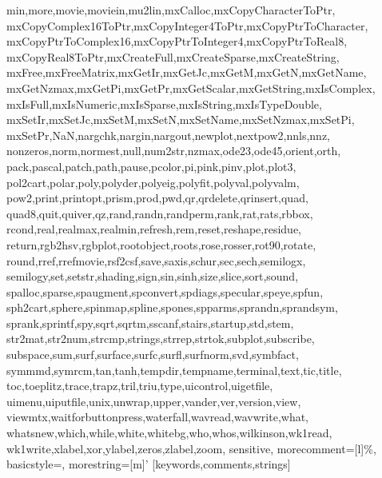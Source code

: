 {{      min,more,movie,moviein,mu2lin,mxCalloc,mxCopyCharacterToPtr,%
      mxCopyComplex16ToPtr,mxCopyInteger4ToPtr,mxCopyPtrToCharacter,%
      mxCopyPtrToComplex16,mxCopyPtrToInteger4,mxCopyPtrToReal8,%
      mxCopyReal8ToPtr,mxCreateFull,mxCreateSparse,mxCreateString,%
      mxFree,mxFreeMatrix,mxGetIr,mxGetJc,mxGetM,mxGetN,mxGetName,%
      mxGetNzmax,mxGetPi,mxGetPr,mxGetScalar,mxGetString,mxIsComplex,%
      mxIsFull,mxIsNumeric,mxIsSparse,mxIsString,mxIsTypeDouble,%
      mxSetIr,mxSetJc,mxSetM,mxSetN,mxSetName,mxSetNzmax,mxSetPi,%
      mxSetPr,NaN,nargchk,nargin,nargout,newplot,nextpow2,nnls,nnz,%
      nonzeros,norm,normest,null,num2str,nzmax,ode23,ode45,orient,orth,%
      pack,pascal,patch,path,pause,pcolor,pi,pink,pinv,plot,plot3,%
      pol2cart,polar,poly,polyder,polyeig,polyfit,polyval,polyvalm,%
      pow2,print,printopt,prism,prod,pwd,qr,qrdelete,qrinsert,quad,%
      quad8,quit,quiver,qz,rand,randn,randperm,rank,rat,rats,rbbox,%
      rcond,real,realmax,realmin,refresh,rem,reset,reshape,residue,%
      return,rgb2hsv,rgbplot,rootobject,roots,rose,rosser,rot90,rotate,%
      round,rref,rrefmovie,rsf2csf,save,saxis,schur,sec,sech,semilogx,%
      semilogy,set,setstr,shading,sign,sin,sinh,size,slice,sort,sound,%
      spalloc,sparse,spaugment,spconvert,spdiags,specular,speye,spfun,%
      sph2cart,sphere,spinmap,spline,spones,spparms,sprandn,sprandsym,%
      sprank,sprintf,spy,sqrt,sqrtm,sscanf,stairs,startup,std,stem,%
      str2mat,str2num,strcmp,strings,strrep,strtok,subplot,subscribe,%
      subspace,sum,surf,surface,surfc,surfl,surfnorm,svd,symbfact,%
      symmmd,symrcm,tan,tanh,tempdir,tempname,terminal,text,tic,title,%
      toc,toeplitz,trace,trapz,tril,triu,type,uicontrol,uigetfile,%
      uimenu,uiputfile,unix,unwrap,upper,vander,ver,version,view,%
      viewmtx,waitforbuttonpress,waterfall,wavread,wavwrite,what,%
      whatsnew,which,while,white,whitebg,who,whos,wilkinson,wk1read,%
      wk1write,xlabel,xor,ylabel,zeros,zlabel,zoom},%
   sensitive,%
   morecomment=[l]\%,%
   basicstyle=\tiny,%
   morestring=[m]'%
  }[keywords,comments,strings]%

\usepackage{algorithmic}

\usepackage{url}

\newcommand{\RR}{\mathbb{R}}
\newcommand{\CC}{\mathbb{C}}


\newtheorem{theorem}{Theorem}[section]
\newtheorem{lemma}[theorem]{Lemma}
\newtheorem{proposition}[theorem]{Proposition}
\newtheorem{corollary}[theorem]{Corollary}
\newtheorem{axiom}[theorem]{Axiom}
\newtheorem{definition}[theorem]{Definition}
\newtheorem{remark}[theorem]{Remark}
\newtheorem{assumption}[theorem]{Assumption}

